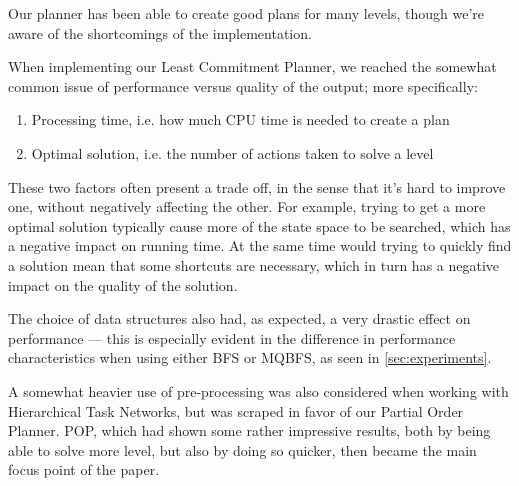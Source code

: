 \documentclass[Main]{subfiles}
\begin{document}
Our planner has been able to create good plans for many levels, though we're aware of the shortcomings of the implementation.




When implementing our Least Commitment Planner, we reached the somewhat common issue of performance versus quality of the output; more specifically:

\begin{enumerate}
	\item Processing time, i.e. how much CPU time is needed to create a plan
	\item Optimal solution, i.e. the number of actions taken to solve a level
\end{enumerate}

These two factors often present a trade off, in the sense that it's hard to improve one, without negatively affecting the other. 
For example, trying to get a more optimal solution typically cause more of the state space to be searched, which has a negative impact on running time.
At the same time would trying to quickly find a solution mean that some shortcuts are necessary, which in turn has a negative impact on the quality of the solution.

The choice of data structures also had, as expected, a very drastic effect on performance ---
this is especially evident in the difference in performance characteristics when using either BFS or MQBFS, as seen in \autoref{sec:experiments}.

A somewhat heavier use of pre-processing was also considered when working with Hierarchical Task Networks, but was scraped in favor of our Partial Order Planner. 
POP, which had shown some rather impressive results, both by being able to solve more level, but also by doing so quicker, then became the main focus point of the paper.
\end{document}
